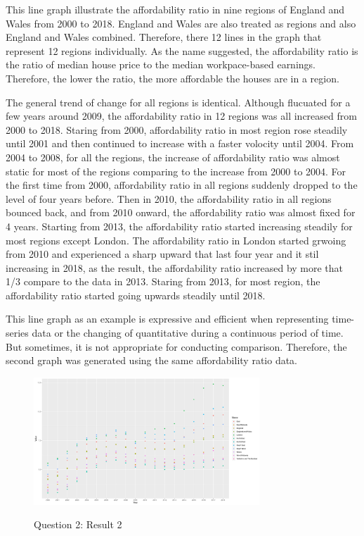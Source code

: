 \documentclass{article}
\begin{document}
This line graph illustrate the affordability ratio in nine regions of England and Wales from 2000 to 2018. 
England and Wales are also treated as regions and also England and Wales combined. Therefore, there 12 lines 
in the graph that represent 12 regions individually. As the name suggested, the affordability ratio is the 
ratio of median house price to the median workpace-based earnings. Therefore, the lower the ratio, the more 
affordable the houses are in a region.

The general trend of change for all regions is identical. Although flucuated for a few years around 2009, 
the affordability ratio in 12 regions was all increased from 2000 to 2018. Staring from 2000, affordability ratio 
in most region rose steadily until 2001 and then continued to increase with a faster volocity until 2004. 
From 2004 to 2008, for all the regions, the increase of affordability ratio was almost static for most of 
the regions comparing to the increase from 2000 to 2004. For the first time from 2000, affordability ratio 
in all regions suddenly dropped to the level of four years before. Then in 2010, the affordability ratio in 
all regions bounced back, and from 2010 onward, the affordability ratio was almost fixed for 4 years. Starting from 2013, 
the affordability ratio started increasing steadily for most regions except London. The affordability ratio in London 
started grwoing from 2010 and experienced a sharp upward that last four year and it stil increasing in 2018, 
as the result, the affordability ratio increased by more that 1/3 compare to the data in 2013. Staring from 2013, 
for most region, the affordability ratio started going upwards steadily until 2018.

This line graph as an example is expressive and efficient when representing time-series data or the changing 
of quantitative during a continuous period of time. But sometimes, it is not appropriate for conducting 
comparison. Therefore, the second graph was generated using the same affordability ratio data.

\begin{figure}[H]
  \begin{minipage}[b]{1.0\linewidth}
    \centering
    \centerline{\includegraphics[width=8.5cm]{Q2Geom_point}}
    \centerline{Question 2: Result 2}\medskip
  \end{minipage}
\end{figure}
\end{document}
